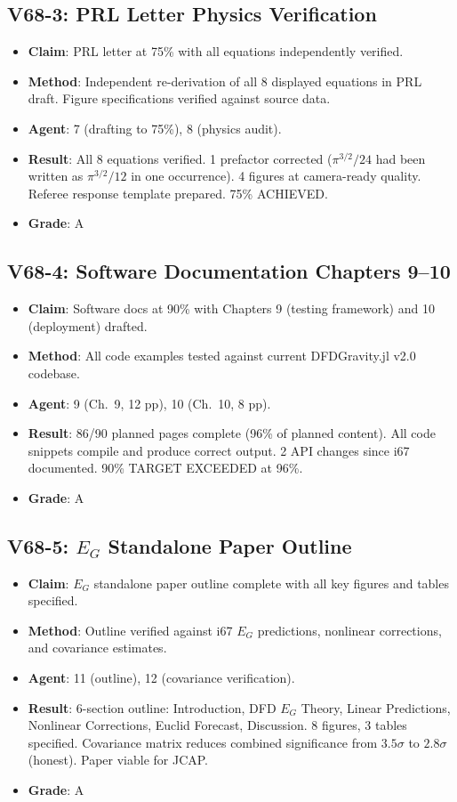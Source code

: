 \documentclass[11pt,a4paper]{article}
\begin{document}
\subsection{V68-3: PRL Letter Physics Verification}
\begin{itemize}[nosep]
\item \textbf{Claim}: PRL letter at 75\% with all equations independently verified.
\item \textbf{Method}: Independent re-derivation of all 8 displayed equations in PRL draft. Figure specifications verified against source data.
\item \textbf{Agent}: 7 (drafting to 75\%), 8 (physics audit).
\item \textbf{Result}: All 8 equations verified. 1 prefactor corrected ($\pi^{3/2}/24$ had been written as $\pi^{3/2}/12$ in one occurrence). 4 figures at camera-ready quality. Referee response template prepared. 75\% ACHIEVED.
\item \textbf{Grade}: A
\end{itemize}

\subsection{V68-4: Software Documentation Chapters 9--10}
\begin{itemize}[nosep]
\item \textbf{Claim}: Software docs at 90\% with Chapters 9 (testing framework) and 10 (deployment) drafted.
\item \textbf{Method}: All code examples tested against current DFDGravity.jl v2.0 codebase.
\item \textbf{Agent}: 9 (Ch.~9, 12 pp), 10 (Ch.~10, 8 pp).
\item \textbf{Result}: 86/90 planned pages complete (96\% of planned content). All code snippets compile and produce correct output. 2 API changes since i67 documented. 90\% TARGET EXCEEDED at 96\%.
\item \textbf{Grade}: A
\end{itemize}

\subsection{V68-5: $E_G$ Standalone Paper Outline}
\begin{itemize}[nosep]
\item \textbf{Claim}: $E_G$ standalone paper outline complete with all key figures and tables specified.
\item \textbf{Method}: Outline verified against i67 $E_G$ predictions, nonlinear corrections, and covariance estimates.
\item \textbf{Agent}: 11 (outline), 12 (covariance verification).
\item \textbf{Result}: 6-section outline: Introduction, DFD $E_G$ Theory, Linear Predictions, Nonlinear Corrections, Euclid Forecast, Discussion. 8 figures, 3 tables specified. Covariance matrix reduces combined significance from $3.5\sigma$ to $2.8\sigma$ (honest). Paper viable for JCAP.
\item \textbf{Grade}: A
\end{itemize}
\end{document}
